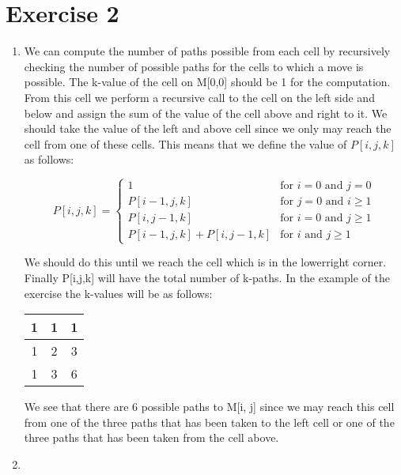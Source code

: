 \documentclass{article}
\begin{document}
\section*{Exercise 2}
\begin{enumerate}[label= \alph* )]
  \item We can compute the number of paths possible from each cell by recursively checking the number of possible paths for the cells to which a move is possible. The k-value of the cell on M[0,0] should be 1 for the computation. From this cell we perform a recursive call to the cell on the left side and below and assign the sum of the value of the cell above and right to it. We should take the value of the left and above cell since we only may reach the cell from one of these cells. This means that we define the value of $P[i,j,k]$ as follows:

  \[
      P[i,j,k] = \left\{\begin{array}{lr}
          1 & \text{for } i = 0 \text{ and } j = 0 \\
          P[i - 1,j,k] & \text{for } j = 0 \text{ and } i \geq 1 \\
          P[i,j-1,k] & \text{for } i = 0 \text{ and } j \geq 1 \\
          P[i - 1,j,k] + P[i,j-1,k] & \text{for } i \text{ and } j \geq 1
          \end{array}\right.
    \]

  We should do this until we reach the cell which is in the lowerright corner. Finally P[i,j,k] will have the total number of k-paths. In the example of the exercise the k-values will be as follows:
  \begin{center}
  \begin{tabular}{| c | c | c |}
    \hline
    1 & 1 & 1 \\ \hline
    1 & 2 & 3 \\ \hline
    1 & 3 & 6 \\
    \hline
  \end{tabular}
\end{center}
We see that there are 6 possible paths to M[i, j] since we may reach this cell from one of the three paths that has been taken to the left cell or one of the three paths that has been taken from the cell above.
\item


\end{enumerate}
\end{document}

